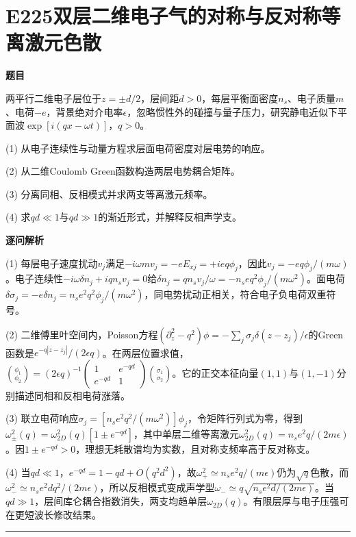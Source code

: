 \documentclass[UTF8,a4paper,11pt,oneside,openany]{ctexbook}
\begin{document}
\section*{E225\quad 双层二维电子气的对称与反对称等离激元色散}
\textbf{题目}\par
两平行二维电子层位于$z=\pm d/2$，层间距$d>0$，每层平衡面密度$n_s$、电子质量$m$、电荷$-e$，背景绝对介电率$\epsilon$，忽略惯性外的碰撞与量子压力，研究静电近似下平面波$\exp[i(qx-\omega t)]$，$q>0$。
\par\smallskip\noindent (1) 从电子连续性与动量方程求层面电荷密度对层电势的响应。
\par\smallskip\noindent (2) 从二维Coulomb Green函数构造两层电势耦合矩阵。
\par\smallskip\noindent (3) 分离同相、反相模式并求两支等离激元频率。
\par\smallskip\noindent (4) 求$qd\ll1$与$qd\gg1$的渐近形式，并解释反相声学支。
\par\medskip\textbf{逐问解析}\par
\par\smallskip\noindent (1) 每层电子速度扰动$v_j$满足$-i\omega mv_j=-eE_{xj}=+ieq\phi_j$，因此$v_j=-eq\phi_j/(m\omega)$。电子连续性$-i\omega\delta n_j+iqn_sv_j=0$给$\delta n_j=qn_sv_j/\omega=-n_se q^2\phi_j/(m\omega^2)$。面电荷$\delta\sigma_j=-e\delta n_j=n_se^2q^2\phi_j/(m\omega^2)$，同电势扰动正相关，符合电子负电荷双重符号。
\par\smallskip\noindent (2) 二维傅里叶空间内，Poisson方程$(\partial_z^2-q^2)\phi=-\sum_j\sigma_j\delta(z-z_j)/\epsilon$的Green函数是$e^{-q|z-z_j|}/(2\epsilon q)$。在两层位置求值，$\binom{\phi_1}{\phi_2}=(2\epsilon q)^{-1}\begin{pmatrix}1&e^{-qd}\\e^{-qd}&1\end{pmatrix}\binom{\sigma_1}{\sigma_2}$。它的正交本征向量$(1,1)$与$(1,-1)$分别描述同相和反相电荷涨落。
\par\smallskip\noindent (3) 联立电荷响应$\sigma_j=[n_se^2q^2/(m\omega^2)]\phi_j$，令矩阵行列式为零，得到$\omega_\pm^2(q)=\omega_{2D}^2(q)[1\pm e^{-qd}]$，其中单层二维等离激元$\omega_{2D}^2(q)=n_se^2q/(2m\epsilon)$。因$1\pm e^{-qd}>0$，理想无耗散谱均为实数，且对称支频率高于反对称支。
\par\smallskip\noindent (4) 当$qd\ll1$，$e^{-qd}=1-qd+O(q^2d^2)$，故$\omega_+^2\simeq n_se^2q/(m\epsilon)$仍为$\sqrt q$色散，而$\omega_-^2\simeq n_se^2dq^2/(2m\epsilon)$，所以反相模式变成声学型$\omega_-\simeq q\sqrt{n_se^2d/(2m\epsilon)}$。当$qd\gg1$，层间库仑耦合指数消失，两支均趋单层$\omega_{2D}(q)$。有限层厚与电子压强可在更短波长修改结果。
\par\medskip\hrule\medskip
\end{document}

